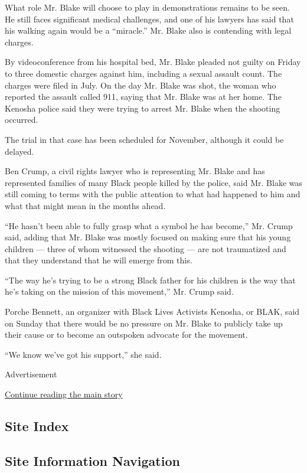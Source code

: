 What role Mr. Blake will choose to play in demonstrations remains to be
seen. He still faces significant medical challenges, and one of his
lawyers has said that his walking again would be a ``miracle.'' Mr.
Blake also is contending with legal charges.

By videoconference from his hospital bed, Mr. Blake pleaded not guilty
on Friday to three domestic charges against him, including a sexual
assault count. The charges were filed in July. On the day Mr. Blake was
shot, the woman who reported the assault called 911, saying that Mr.
Blake was at her home. The Kenosha police said they were trying to
arrest Mr. Blake when the shooting occurred.

The trial in that case has been scheduled for November, although it
could be delayed.

Ben Crump, a civil rights lawyer who is representing Mr. Blake and has
represented families of many Black people killed by the police, said Mr.
Blake was still coming to terms with the public attention to what had
happened to him and what that might mean in the months ahead.

``He hasn't been able to fully grasp what a symbol he has become,'' Mr.
Crump said, adding that Mr. Blake was mostly focused on making sure that
his young children --- three of whom witnessed the shooting --- are not
traumatized and that they understand that he will emerge from this.

``The way he's trying to be a strong Black father for his children is
the way that he's taking on the mission of this movement,'' Mr. Crump
said.

Porche Bennett, an organizer with Black Lives Activists Kenosha, or
BLAK, said on Sunday that there would be no pressure on Mr. Blake to
publicly take up their cause or to become an outspoken advocate for the
movement.

``We know we've got his support,'' she said.

Advertisement

\protect\hyperlink{after-bottom}{Continue reading the main story}

\hypertarget{site-index}{%
\subsection{Site Index}\label{site-index}}

\hypertarget{site-information-navigation}{%
\subsection{Site Information
Navigation}\label{site-information-navigation}}

